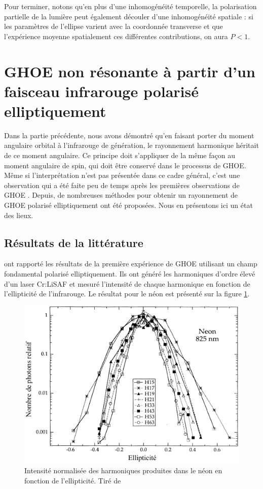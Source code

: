 Pour terminer, notons qu'en plus d'une inhomogénéité temporelle, la polarisation partielle de la lumière peut également découler d'une inhomogénéité spatiale : si les paramètres de l'ellipse varient avec la coordonnée transverse et que l'expérience moyenne spatialement ces différentes contributions, on aura $P<1$.

\section{GHOE non résonante à partir d'un faisceau infrarouge polarisé elliptiquement}
\label{sec:ghoepolar}
Dans la partie précédente, nous avons démontré qu'en faisant porter du moment angulaire orbital à l'infrarouge de génération, le rayonnement harmonique héritait de ce moment angulaire. Ce principe doit s'appliquer de la même façon au moment angulaire de spin, qui doit être conservé dans le processus de GHOE. Même si l'interprétation n'est pas présentée dans ce cadre général, c'est une observation qui a été faite peu de temps après les premières observations de GHOE . Depuis, de nombreuses méthodes pour obtenir un rayonnement de GHOE polarisé elliptiquement ont été proposées. Nous en présentons ici un état des lieux. 

\subsection{Résultats de la littérature}
 ont rapporté les résultats de la première expérience de GHOE utilisant un champ fondamental polarisé elliptiquement. Ils ont généré les harmoniques d'ordre élevé d'un laser \shorthandoff{:} Cr:LiSAF \shorthandon{:} et mesuré l'intensité de chaque harmonique en fonction de l'ellipticité de l'infrarouge. Le résultat pour le néon est présenté sur la figure \ref{Fig:budil}.
\begin{figure}[!ht]
\centering
\includegraphics[width=0.6\columnwidth]{Figures/Polar/Intensity_f_ellipticity_budil}%
\caption{Intensité normalisée des harmoniques produites dans le néon en fonction de l'ellipticité. Tiré de }%
\label{Fig:budil}%
\end{figure}

